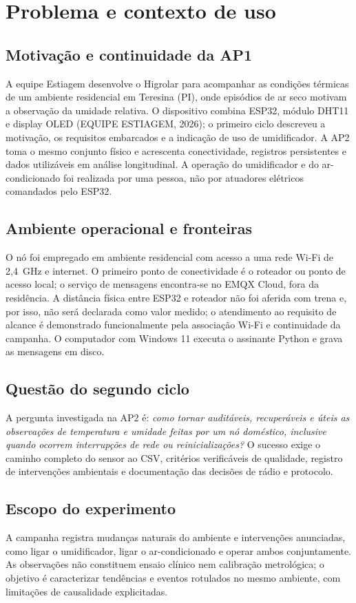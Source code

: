 \chapter{Problema e contexto de uso}
\label{cap:problema}
\rubricaJustificativa
\section{Motivação e continuidade da AP1}
A equipe Estiagem desenvolve o Higrolar para acompanhar as condições térmicas de um ambiente residencial em Teresina (PI), onde episódios de ar seco motivam a observação da umidade relativa. O dispositivo combina ESP32, módulo DHT11 e display OLED (EQUIPE ESTIAGEM, 2026); o primeiro ciclo descreveu a motivação, os requisitos embarcados e a indicação de uso de umidificador. A AP2 toma o mesmo conjunto físico e acrescenta conectividade, registros persistentes e dados utilizáveis em análise longitudinal. A operação do umidificador e do ar-condicionado foi realizada por uma pessoa, não por atuadores elétricos comandados pelo ESP32.

\section{Ambiente operacional e fronteiras}
O nó foi empregado em ambiente residencial com acesso a uma rede Wi-Fi de 2,4~GHz e internet. O primeiro ponto de conectividade é o roteador ou ponto de acesso local; o serviço de mensagens encontra-se no EMQX Cloud, fora da residência. A distância física entre ESP32 e roteador não foi aferida com trena e, por isso, não será declarada como valor medido; o atendimento ao requisito de alcance é demonstrado funcionalmente pela associação Wi-Fi e continuidade da campanha. O computador com Windows 11 executa o assinante Python e grava as mensagens em disco.

\section{Questão do segundo ciclo}
A pergunta investigada na AP2 é: \emph{como tornar auditáveis, recuperáveis e úteis as observações de temperatura e umidade feitas por um nó doméstico, inclusive quando ocorrem interrupções de rede ou reinicializações?} O sucesso exige o caminho completo do sensor ao CSV, critérios verificáveis de qualidade, registro de intervenções ambientais e documentação das decisões de rádio e protocolo.
\section{Escopo do experimento}
A campanha registra mudanças naturais do ambiente e intervenções anunciadas, como ligar o umidificador, ligar o ar-condicionado e operar ambos conjuntamente. As observações não constituem ensaio clínico nem calibração metrológica; o objetivo é caracterizar tendências e eventos rotulados no mesmo ambiente, com limitações de causalidade explicitadas.
